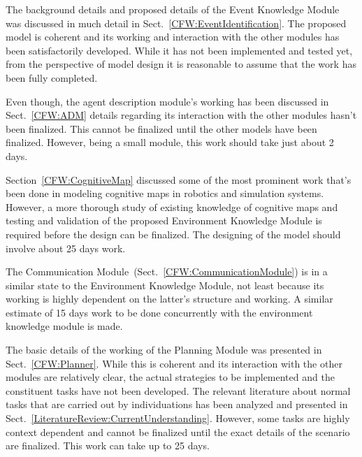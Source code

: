 The background details and proposed details of the Event Knowledge Module was discussed in much detail in Sect.~\ref{CFW:EventIdentification}. The proposed model is coherent and its working and interaction with the other modules has been satisfactorily developed. While it has not been implemented and tested yet, from the perspective of model design it is reasonable to assume that the work has been fully completed.

Even though, the agent description module's working has been discussed in Sect.~\ref{CFW:ADM} details regarding its interaction with the other modules hasn't been finalized. This cannot be finalized until the other models have been finalized. However, being a small module, this work should take just about 2 days.

Section~\ref{CFW:CognitiveMap} discussed some of the most prominent work that's been done in modeling cognitive maps in robotics and simulation systems. However, a more thorough study of existing knowledge of cognitive maps and testing and validation of the proposed Environment Knowledge Module is required before the design can be finalized. The designing of the model should involve about 25 days work. 

The Communication Module~(Sect.~\ref{CFW:CommunicationModule}) is in a similar state to the Environment Knowledge Module, not least because its working is highly dependent on the latter's structure and working. A similar estimate of 15 days work to be done concurrently with the environment knowledge module is made.

The basic details of the working of the Planning Module was presented in Sect.~\ref{CFW:Planner}. While this is coherent and its interaction with the other modules are relatively clear, the actual strategies to be implemented and the constituent tasks have not been developed. The relevant literature about normal tasks that are carried out by individuations has been analyzed and presented in Sect.~\ref{LiteratureReview:CurrentUnderstanding}. However, some tasks are highly context dependent and cannot be finalized until the exact details of the scenario are finalized. This work can take up to 25 days.

